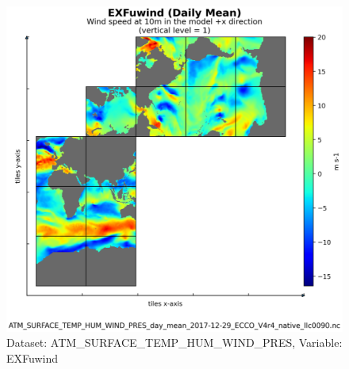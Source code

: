 \begin{figure}[H]
\centering
\includegraphics[scale=0.55]{../images/plots/native_plots/Atmosphere_Surface_Temperature_Humidity_Wind_and_Pressure/EXFuwind.png}
\caption{Dataset: ATM\_SURFACE\_TEMP\_HUM\_WIND\_PRES, Variable: EXFuwind}
\label{tab:table-ATM_SURFACE_TEMP_HUM_WIND_PRES_EXFuwind-Plot}
\end{figure}
\newpage
\pagebreak
